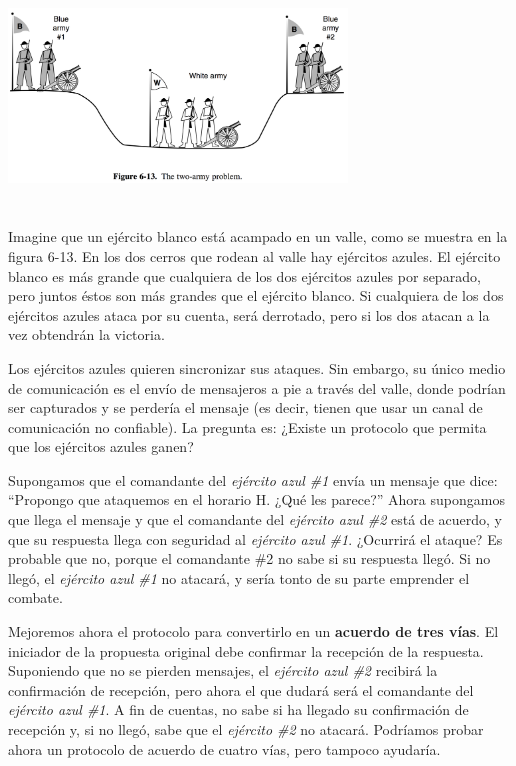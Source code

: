 \documentclass[10pt,a4paper]{report}
\begin{document}
	\begin{center}
		\includegraphics[width=9cm, height=6cm]{./imagenes/ejercitos.png}
	\end{center}

	\par Imagine que un ejército blanco está acampado en un valle, como se muestra en la figura 6-13. En los dos cerros que rodean al valle hay ejércitos azules. El ejército blanco es más grande que cualquiera de los dos ejércitos azules por separado, pero juntos éstos son más grandes que el ejército blanco. Si cualquiera de los dos ejércitos azules ataca por su cuenta, será derrotado, pero si los dos atacan a la vez obtendrán la victoria.

	\par Los ejércitos azules quieren sincronizar sus ataques. Sin embargo, su único medio de comunicación es el envío de mensajeros a pie a través del valle, donde podrían ser capturados y se perdería el mensaje (es decir, tienen que usar un canal de comunicación no confiable). La pregunta es: ¿Existe un protocolo que permita que los ejércitos azules ganen?
	
	\par Supongamos que el comandante del \textit{ejército azul \#1} envía un mensaje que dice: “Propongo que ataquemos en el horario H. ¿Qué les parece?” Ahora supongamos que llega el mensaje y que el comandante del \textit{ejército azul \#2} está de acuerdo, y que su respuesta llega con seguridad al \textit{ejército azul \#1}. ¿Ocurrirá el ataque? Es probable que no, porque el comandante \#2 no sabe si su respuesta llegó. Si no llegó, el \textit{ejército azul \#1} no atacará, y sería tonto de su parte emprender el combate.
	
	\par Mejoremos ahora el protocolo para convertirlo en un \textbf{acuerdo de tres vías}. El iniciador de la propuesta original debe confirmar la recepción de la respuesta. Suponiendo que no se pierden mensajes, el \textit{ejército azul \#2} recibirá la confirmación de recepción, pero ahora el que dudará será el comandante del \textit{ejército azul \#1}. A fin de cuentas, no sabe si ha llegado su confirmación de recepción y, si no llegó, sabe que el \textit{ejército \#2} no atacará. Podríamos probar ahora un protocolo de acuerdo de cuatro vías, pero tampoco ayudaría.
	
\end{document}
